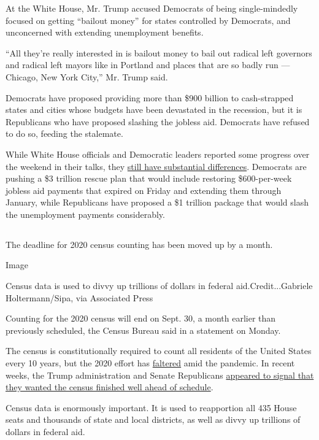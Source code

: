 At the White House, Mr. Trump accused Democrats of being single-mindedly
focused on getting ``bailout money'' for states controlled by Democrats,
and unconcerned with extending unemployment benefits.

``All they're really interested in is bailout money to bail out radical
left governors and radical left mayors like in Portland and places that
are so badly run --- Chicago, New York City,'' Mr. Trump said.

Democrats have proposed providing more than \$900 billion to
cash-strapped states and cities whose budgets have been devastated in
the recession, but it is Republicans who have proposed slashing the
jobless aid. Democrats have refused to do so, feeding the stalemate.

While White House officials and Democratic leaders reported some
progress over the weekend in their talks, they
\href{https://www.nytimes.com/2020/08/02/us/politics/coronavirus-jobless-aid.html}{still
have substantial differences}. Democrats are pushing a \$3 trillion
rescue plan that would include restoring \$600-per-week jobless aid
payments that expired on Friday and extending them through January,
while Republicans have proposed a \$1 trillion package that would slash
the unemployment payments considerably.

\hypertarget{-2}{%
\subsection{}\label{-2}}

The deadline for 2020 census counting has been moved up by a month.

Image

Census data is used to divvy up trillions of dollars in federal
aid.Credit...Gabriele Holtermann/Sipa, via Associated Press

Counting for the 2020 census will end on Sept. 30, a month earlier than
previously scheduled, the Census Bureau said in a statement on Monday.

The census is constitutionally required to count all residents of the
United States every 10 years, but the 2020 effort has
\href{https://www.nytimes.com/2020/04/18/us/coronavirus-census.html}{faltered}
amid the pandemic. In recent weeks, the Trump administration and Senate
Republicans
\href{https://www.nytimes.com/2020/07/28/us/trump-census.html}{appeared
to signal that they wanted the census finished well ahead of schedule}.

Census data is enormously important. It is used to reapportion all 435
House seats and thousands of state and local districts, as well as divvy
up trillions of dollars in federal aid.

